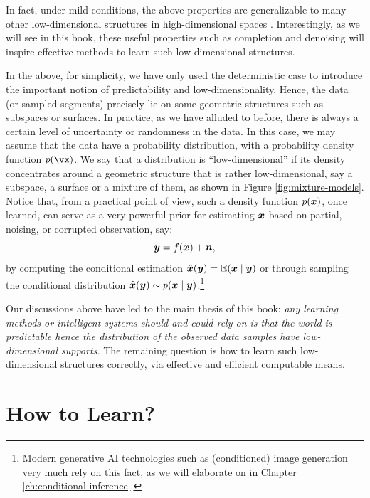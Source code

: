 \documentclass[../../book-main.tex]{subfiles}
\begin{document}
In fact, under mild conditions, the above properties are generalizable to many other low-dimensional structures in high-dimensional spaces \cite{Wright-Ma-2022}. Interestingly, as we will see in this book, these useful properties such as completion and denoising will inspire effective methods to learn such low-dimensional structures. 

In the above, for simplicity, we have only used the deterministic case to introduce the important notion of predictability and low-dimensionality. Hence, the data (or sampled segments) precisely lie on some geometric structures such as subspaces or surfaces. In practice, as we have alluded to before, there is always a certain level of uncertainty or randomness in the data. In this case, we may assume that the data have a probability distribution, with a probability density function $p(\vx)$. We say that a distribution is ``low-dimensional'' if its density concentrates around a geometric structure that is rather low-dimensional, say a subspace, a surface or a mixture of them, as shown in Figure \ref{fig:mixture-models}. Notice that, from a practical point of view, such a density function $p(\bm{x})$, once learned, can serve as a very powerful prior for estimating $\bm{x}$ based on partial, noising, or corrupted observation, say: 
\begin{equation}
\bm{y} = f(\bm{x}) + \boldsymbol{n},
\end{equation}
by computing the conditional estimation $\hat{\bm{x}}(\bm{y}) = \mathbb{E}(\bm{x} \mid \bm{y})$ or through sampling the conditional distribution $\hat{\bm{x}}(\bm{y}) \sim p(\bm{x}\mid \bm{y})$.\footnote{Modern generative AI technologies such as (conditioned) image generation very much rely on this fact, as we will elaborate on in Chapter \ref{ch:conditional-inference}.}

Our discussions above have led to the main thesis of this book: {\em any learning methods or intelligent systems should and could rely on is that the world is predictable hence the distribution of the observed data samples have low-dimensional supports.} The remaining question is how to learn such low-dimensional structures correctly, via effective and efficient computable means. 

\section{How to Learn?}
\end{document}
